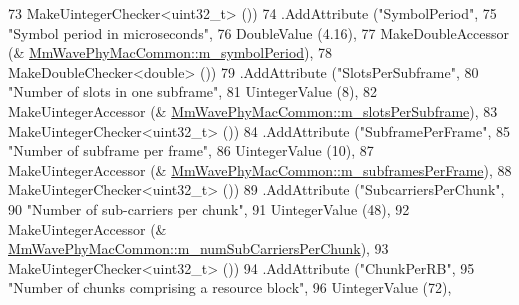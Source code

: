 \begin{DoxyCode}
73                                                          MakeUintegerChecker<uint32\_t> ())
74                         .AddAttribute (\textcolor{stringliteral}{"SymbolPeriod"},
75                                                    \textcolor{stringliteral}{"Symbol period in microseconds"},
76                                                    DoubleValue (4.16),
77                                                    MakeDoubleAccessor (&
      \hyperlink{classns3_1_1MmWavePhyMacCommon_a89e43c7e5b4a943b65242970705af418}{MmWavePhyMacCommon::m\_symbolPeriod}),
78                                                    MakeDoubleChecker<double> ())
79                         .AddAttribute (\textcolor{stringliteral}{"SlotsPerSubframe"},
80                                                    \textcolor{stringliteral}{"Number of slots in one subframe"},
81                                                    UintegerValue (8),
82                                                    MakeUintegerAccessor (&
      \hyperlink{classns3_1_1MmWavePhyMacCommon_a98ab098ec394b9ededfad71a1c82e374}{MmWavePhyMacCommon::m\_slotsPerSubframe}),
83                                                    MakeUintegerChecker<uint32\_t> ())
84                         .AddAttribute (\textcolor{stringliteral}{"SubframePerFrame"},
85                                                    \textcolor{stringliteral}{"Number of subframe per frame"},
86                                                    UintegerValue (10),
87                                                    MakeUintegerAccessor (&
      \hyperlink{classns3_1_1MmWavePhyMacCommon_a887821cbbb1b758b6a736c46b0039d6a}{MmWavePhyMacCommon::m\_subframesPerFrame}),
88                                                    MakeUintegerChecker<uint32\_t> ())
89                         .AddAttribute (\textcolor{stringliteral}{"SubcarriersPerChunk"},
90                                                    \textcolor{stringliteral}{"Number of sub-carriers per chunk"},
91                                                    UintegerValue (48),
92                                                    MakeUintegerAccessor (&
      \hyperlink{classns3_1_1MmWavePhyMacCommon_a826b986235b169920ac1a6b26ee7f59e}{MmWavePhyMacCommon::m\_numSubCarriersPerChunk}),
93                                                    MakeUintegerChecker<uint32\_t> ())
94                         .AddAttribute (\textcolor{stringliteral}{"ChunkPerRB"},
95                                                    \textcolor{stringliteral}{"Number of chunks comprising a resource block"},
96                                                    UintegerValue (72),

\end{DoxyCode}

